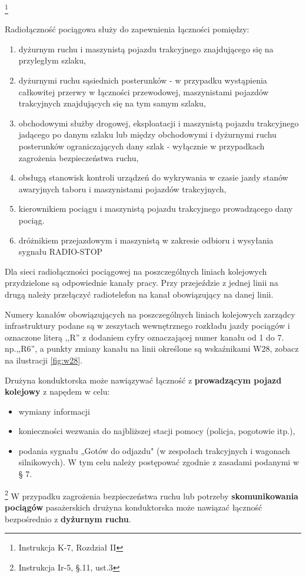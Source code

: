 \footnote{Instrukcja K-7, Rozdział II}

Radiołączność pociągowa służy do zapewnienia łączności pomiędzy:
\begin{enumerate}
\item dyżurnym ruchu i maszynistą pojazdu trakcyjnego znajdującego się na przyległym szlaku,
\item dyżurnymi ruchu sąsiednich posterunków - w przypadku wystąpienia całkowitej przerwy w łączności przewodowej, maszynistami pojazdów trakcyjnych znajdujących się na tym samym szlaku,
\item obchodowymi służby drogowej, eksploatacji i maszynistą pojazdu trakcyjnego jadącego po danym szlaku lub między obchodowymi i dyżurnymi
ruchu posterunków ograniczających dany szlak - wyłącznie w przypadkach zagrożenia bezpieczeństwa ruchu,
\item obsługą stanowisk kontroli urządzeń do wykrywania w czasie jazdy stanów awaryjnych taboru i maszynistami pojazdów trakcyjnych,
\item kierownikiem pociągu i maszynistą pojazdu trakcyjnego prowadzącego dany pociąg.
\item dróżnikiem przejazdowym i maszynistą w zakresie odbioru i wysyłania sygnału RADIO-STOP
\end{enumerate}

Dla sieci radiołączności pociągowej na poszczególnych liniach kolejowych przydzielone są odpowiednie kanały pracy. Przy przejeździe z jednej linii na drugą należy przełączyć radiotelefon na kanał obowiązujący na danej linii.

Numery kanałów obowiązujących na poszczególnych liniach kolejowych zarządcy infrastruktury podane są w zeszytach wewnętrznego rozkładu jazdy
pociągów i oznaczone literą ,,R'' z dodaniem cyfry oznaczającej numer kanału od 1 do 7. np.,,R6'', a punkty zmiany kanału na linii określone są wskaźnikami W28, zobacz na ilustracji \ref{fig:w28}.

Drużyna konduktorska może nawiązywać łączność z \textbf{prowadzącym pojazd kolejowy} z napędem w celu:
\begin{itemize}
	\item wymiany informacji
	\item konieczności wezwania do najbliższej stacji pomocy (policja, pogotowie itp.),
	\item podania sygnału „Gotów do odjazdu" (w zespołach trakcyjnych i wagonach silnikowych). W tym celu należy postępować zgodnie
	z zasadami podanymi w § 7.
\end{itemize}
\footnote{Instrukcja Ir-5, \S.11, ust.3}
W przypadku zagrożenia bezpieczeństwa ruchu lub potrzeby \textbf{skomunikowania pociągów} pasażerskich drużyna konduktorska może nawiązać łączność bezpośrednio z \textbf{dyżurnym ruchu}. 

